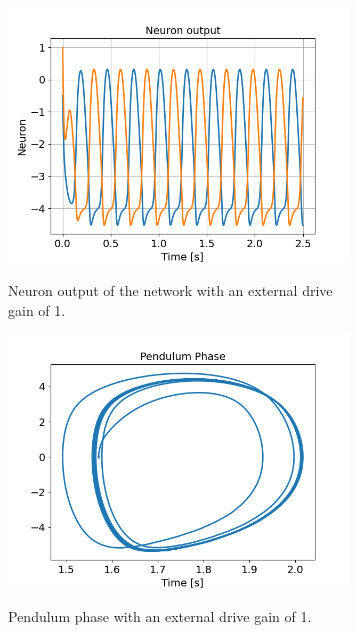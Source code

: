 \documentclass{cmc}
\begin{document}
\begin{figure}[H]
 \centering
  \begin{subfigure}[b]{0.45\textwidth}
    { \centering
      \includegraphics[width=0.99\textwidth]{figures/3b_1_neuron_output.png} }
    \caption{Neuron output of the network with an external drive gain of 1.}
    \label{fig:3b_1_neuron_output}
  \end{subfigure}
  \begin{subfigure}[b]{0.45\textwidth}
    { \centering
      \includegraphics[width=0.99\textwidth]{figures/3b_1_pendulum_phase.png} }
    \caption{Pendulum phase with an external drive gain of 1.}
    \label{fig:3b_pendulum_phase}
  \end{subfigure}
  \begin{subfigure}[b]{0.45\textwidth}

\end{subfigure}
\end{figure}
\end{document}
